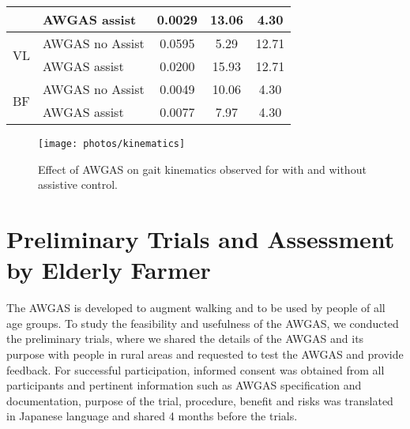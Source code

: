 \documentclass[paper,JRM,paper]{jaciiiarticle}
\begin{document}
\begin{table}[h]
{\begin{tabular}{@{}llccc@{}}
		& AWGAS assist                   & 0.0029  & 13.06   & 4.30                                                           \\ \midrule
		\multirow{2}{*}{VL}  & AWGAS no Assist                & 0.0595  & 5.29    & 12.71                                                          \\ 
		& AWGAS assist                   & 0.0200  & 15.93   & 12.71                                                          \\ \midrule
		\multirow{2}{*}{BF}  & AWGAS no Assist                & 0.0049  & 10.06   & 4.30                                                           \\ 
		& AWGAS assist                   & 0.0077  & 7.97    & 4.30                                                           \\ \bottomrule
	\end{tabular}
	}

	\label{ttestresult}
\end{table}

\begin{figure}
	\centering
	\texttt{[image: photos/kinematics]}
	\caption{Effect of AWGAS on gait kinematics observed for with and without assistive control. }
	\label{fig:kinematics}
\end{figure}


\section{Preliminary Trials and Assessment by Elderly Farmer}

The AWGAS is developed to augment walking and to be used by people of all age groups. To study the feasibility and usefulness of the AWGAS, we conducted the preliminary trials, where we shared the details of the AWGAS and its purpose with people in rural areas and requested to test the AWGAS and provide feedback. For successful participation, informed consent was obtained from all participants and pertinent information such as AWGAS specification and documentation, purpose of the trial, procedure, benefit and risks was translated in Japanese language and shared 4 months before the trials. 
\end{document}
